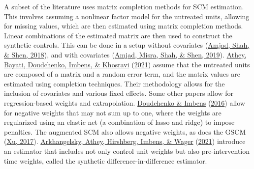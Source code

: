 \documentclass[12pt,nobind, a4paper]{reedthesis}
\begin{document}
 A subset of the literature uses matrix completion methods for SCM estimation. This involves assuming a nonlinear factor model for the untreated units, allowing for missing values, which are then estimated using matrix completion methods. Linear combinations of the estimated matrix are then used to construct the synthetic controls. This can be done in a setup without covariates (\protect\hyperlink{ref-amjad_robust_2018}{Amjad, Shah, \& Shen, 2018}), and with covariates (\protect\hyperlink{ref-amjad_mrsc_2019}{Amjad, Misra, Shah, \& Shen, 2019}). \protect\hyperlink{ref-athey_matrix_2021}{Athey, Bayati, Doudchenko, Imbens, \& Khosravi} (\protect\hyperlink{ref-athey_matrix_2021}{2021}) assume that the untreated units are composed of a matrix and a random error term, and the matrix values are estimated using completion techniques. Their methodology allows for the inclusion of covariates and various fixed effects. Some other papers allow for regression-based weights and extrapolation. \protect\hyperlink{ref-doudchenko_balancing_2016}{Doudchenko \& Imbens} (\protect\hyperlink{ref-doudchenko_balancing_2016}{2016}) allow for negative weights that may not sum up to one, where the weights are regularized using an elastic net (a combination of lasso and ridge) to impose penalties. The augmented SCM also allows negative weights, as does the GSCM (\protect\hyperlink{ref-xu_generalized_2017}{Xu, 2017}). \protect\hyperlink{ref-arkhangelsky_synthetic_2021}{Arkhangelsky, Athey, Hirshberg, Imbens, \& Wager} (\protect\hyperlink{ref-arkhangelsky_synthetic_2021}{2021}) introduce an estimator that includes not only control unit weights but also pre-intervention time weights, called the synthetic difference-in-difference estimator.
 \linebreak
\end{document}
